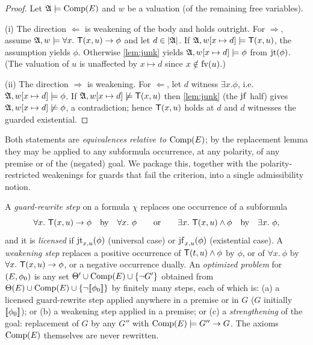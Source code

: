 \begin{proof}
  Let $\AA \models \Comp$ and $w$ be a valuation (of the remaining free
  variables).

  (i) The direction $\Leftarrow$ is weakening of the body and holds
  outright.  For $\Rightarrow$, assume
  $\AA, w \models \forall x.\ \T(x,u) \imp \phi$ and let $d \in |\AA|$.
  If $\AA, w[x \mapsto d] \models \T(x,u)$, the assumption yields
  $\phi$.  Otherwise \cref{lem:junk} yields
  $\AA, w[x \mapsto d] \models \phi$ from $\jt(\phi)$.  (The valuation of
  $u$ is unaffected by $x \mapsto d$ since $x \notin \fv{u}$.)

  (ii) The direction $\Rightarrow$ is weakening.  For $\Leftarrow$, let
  $d$ witness $\exists x.\phi$, i.e.\
  $\AA, w[x \mapsto d] \models \phi$.  If
  $\AA, w[x \mapsto d] \not\models \T(x,u)$ then \cref{lem:junk} (the
  $\jf$ half) gives $\AA, w[x\mapsto d] \not\models \phi$, a
  contradiction; hence $\T(x,u)$ holds at $d$ and $d$ witnesses the
  guarded existential.
\end{proof}

Both statements are \emph{equivalences relative to $\Comp$}; by the
replacement lemma they may be applied to any subformula occurrence, at any
polarity, of any premise or of the (negated) goal.  We package this,
together with the polarity-restricted weakenings for guards that fail the
criterion, into a single admissibility notion.

\begin{definition}
  \label{def:admissible}
  A \emph{guard-rewrite step} on a formula $\chi$ replaces one occurrence
  of a subformula
  \[
    \forall x.\ \T(x,u) \imp \phi
    \quad\text{by}\quad \forall x.\ \phi
    \qquad\text{or}\qquad
    \exists x.\ \T(x,u) \wedge \phi
    \quad\text{by}\quad \exists x.\ \phi ,
  \]
  and it is \emph{licensed} if $\jtx{x}{u}(\phi)$ (universal case) or
  $\jfx{x}{u}(\phi)$ (existential case).  A \emph{weakening step} replaces
  a positive occurrence of $\T(t,u) \wedge \phi$ by $\phi$, or of
  $\forall x.\ \phi$ by $\forall x.\ \T(x,u) \imp \phi$, or a negative
  occurrence dually.  An \emph{optimized problem} for $(\Env,\phi_0)$ is
  any set $\Theta' \cup \Comp \cup \{\neg G'\}$ obtained from
  $\Ax \cup \Comp \cup \{\neg\enc{\phi_0}\}$ by finitely many steps, each
  of which is: (a) a licensed guard-rewrite step applied anywhere in a
  premise or in $G$ ($G$ initially $\enc{\phi_0}$); or (b) a weakening
  step applied in a premise; or (c) a \emph{strengthening} of the goal:
  replacement of $G$ by any $G''$ with $\Comp \models G'' \imp G$.  The
  axioms $\Comp$ themselves are never rewritten.
\end{definition}

